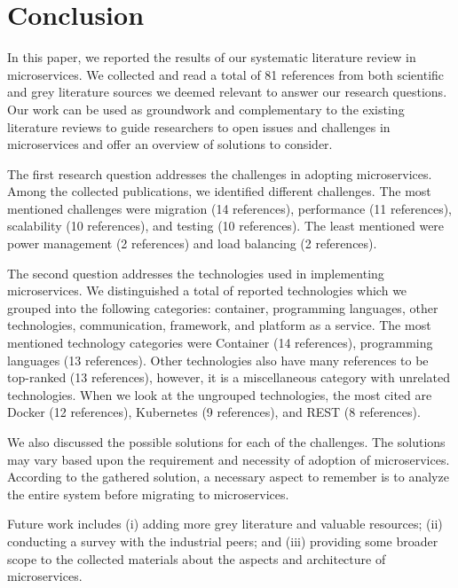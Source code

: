 
\section{Conclusion}\label{sec:conclusion}

In this paper, we reported the results of our systematic literature review in microservices. We collected and read a total of 81 references from both scientific and grey literature sources we deemed relevant to answer our research questions. Our work can be used as groundwork and complementary to the existing literature reviews to guide researchers to open issues and challenges in microservices and offer an overview of solutions to consider.

The first research question addresses the challenges in adopting microservices. Among the collected publications, we identified \challengecount different challenges. The most mentioned challenges were migration (14 references), performance (11 references), scalability (10 references), and testing (10 references). The least mentioned were power management (2 references) and load balancing (2 references). 

The second question addresses the technologies used in implementing microservices. We distinguished a total of \techcount reported technologies which we grouped into the following categories: container, programming languages, other technologies, communication, framework, and platform as a service. The most mentioned technology categories were Container (14 references), programming languages (13 references). Other technologies also have many references to be top-ranked (13 references), however, it is a miscellaneous category with unrelated technologies. When we look at the ungrouped technologies, the most cited are Docker (12 references), Kubernetes (9 references), and REST (8 references).

We also discussed the possible solutions for each of the challenges. The solutions may vary based upon the requirement and necessity of adoption of microservices. According to the gathered solution, a necessary aspect to remember is to analyze the entire system before migrating to microservices.

Future work includes (i) adding more grey literature and valuable resources; (ii) conducting a survey with the industrial peers; and (iii) providing some broader scope to the collected materials about the aspects and architecture of microservices.







